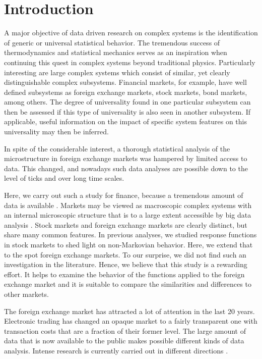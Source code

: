 \section{Introduction}\label{sec:introduction}

A major objective of data driven research on complex systems is the
identification of generic or universal statistical behavior. The tremendous
success of thermodynamics and statistical mechanics serves as an inspiration
when continuing this quest in complex systems beyond traditional physics.
Particularly interesting are large complex systems which consist of similar,
yet clearly distinguishable complex subsystems. Financial markets, for example,
have well defined subsystems as foreign exchange markets, stock markets, bond
markets, among others. The degree of universality found in one particular
subsystem can then be assessed if this type of universality is also seen in
another subsystem. If applicable, useful information on the impact of specific
system features on this universality may then be inferred.

In spite of the considerable interest, a thorough statistical analysis of
the microstructure in foreign exchange markets was hampered by limited access
to data. This changed, and nowadays such data analyses are possible down to the
level of ticks and over long time scales.

Here, we carry out such a study for finance, because a tremendous amount of
data is available \cite{physicists_contribution}. Markets may be viewed as
macroscopic complex systems with an internal microscopic structure that is to a
large extent accessible by big data analysis \cite{complex_markets}.
Stock markets and foreign exchange markets are clearly distinct, but share many
common features. In previous analyses, we studied response functions in stock
markets to shed light on non-Markovian behavior. Here, we extend that to the
spot foreign exchange markets. To our surprise, we did not find such an
investigation in the literature. Hence, we believe that this study is a
rewarding effort. It helps to examine the behavior of the functions applied to
the foreign exchange market and it is suitable to compare the similarities and
differences to other markets.

The foreign exchange market has attracted a lot of attention in the last 20
years. Electronic trading has changed an opaque market to a fairly transparent
one with transaction costs that are a fraction of their former level. The large
amount of data that is now available to the public makes possible different
kinds of data analysis. Intense research is currently carried out in different
directions
\cite{forex_liquidity,info_forex,intraday_forex,forex_structure,teach_spread,forex_microstructure,electronic_forex,forex_algorithmic,curr_speculation,patterns_forex,eur_change_forex,spread_competition,political_forex,forex_volatility,local_forex,forex_inefficiency}.

